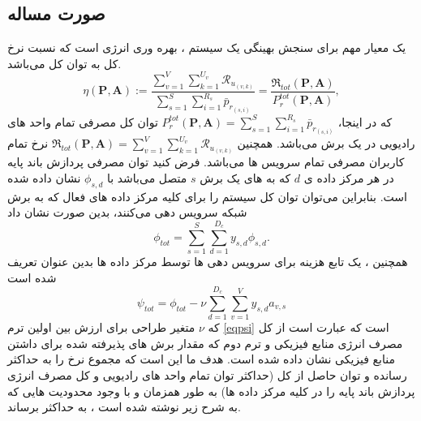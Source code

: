 \subsection{صورت مساله}
یک معیار مهم برای سنجش بهینگی یک سیستم ، بهره وری انرژی است که نسبت نرخ کل به توان کل می‌باشد.
\begin{equation}
\textstyle \eta(\boldsymbol{P},\boldsymbol{A}) := \frac{\sum\limits_{v=1}^{V} \sum\limits_{k=1}^{{U}_v}\mathcal{R}_{u_{(v,k)}} }{\sum\limits_{s=1}^{S} \sum\limits_{i=1}^{{R}_s}\bar{p}_{r_{(s,i)}}} = \frac{\mathfrak{R}_{tot}(\boldsymbol{P},\boldsymbol{A})}{P_r^{{tot}}(\boldsymbol{P},\boldsymbol{A})},
\end{equation}
که در اینجا، 
 $P_r^{tot}(\boldsymbol{P},\boldsymbol{A}) = \sum\limits_{s=1}^{S}\sum\limits_{i=1}^{{R}_s}\bar{p}_{r_{(s,i)}}$
 توان کل مصرفی تمام واحد های رادیویی در یک برش می‌باشد.
همچنین 
 $\mathfrak{R}_{tot}(\boldsymbol{P},\boldsymbol{A}) = \sum\limits_{v=1}^{V} \sum\limits_{k=1}^{{U}_v}\mathcal{R}_{u_{(v,k)}} $
 نرخ تمام کاربران مصرفی تمام سرویس ها می‌باشد.
فرض کنید توان مصرفی پردازش باند پایه در هر مرکز داده ی $d$ که به  های یک برش $s$ متصل می‌باشد با   
$\phi_{s,d}$
نشان داده شده است.
بنابراین می‌توان توان کل سیستم را برای کلیه مرکز داده های فعال که به برش شبکه سرویس دهی می‌کنند، بدین صورت نشان داد
\begin{equation*}
\textstyle \phi_{tot} = \sum_{s=1}^{S}\sum_{d=1}^{D_c}y_{s,d}\phi_{s,d}.
\end{equation*}
همچنین ، یک تابع هزینه برای سرویس دهی ها توسط مرکز داده ها بدین عنوان تعریف شده است
\begin{equation}\label{eqpsi}
\textstyle  \psi_{tot} = \phi_{tot} - \nu \sum_{d=1}^{D_c}\sum_{v=1}^{V}y_{s,d}a_{v,s}
\end{equation}
که $\nu$
متغیر طراحی برای ارزش بین اولین ترم 
\eqref{eqpsi}
 است که عبارت است از کل مصرف انرژی منابع فیزیکی و ترم دوم که مقدار برش های پذیرفته شده برای داشتن منابع فیزیکی نشان داده شده است.
هدف ما این است که مجموع نرخ را به حداکثر رسانده و توان حاصل از کل (حداکثر توان تمام واحد های رادیویی و کل مصرف انرژی پردازش باند پایه را در کلیه مرکز داده ها) به طور همزمان و با وجود محدودیت هایی که به شرح زیر نوشته شده است ، به حداکثر برساند.
